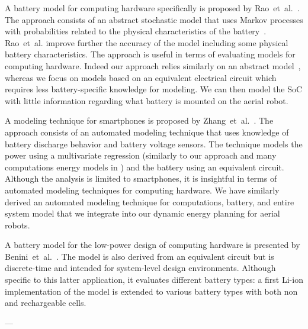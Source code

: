 A battery model for computing hardware specifically is proposed by Rao~et~al.~\citep{rao2005battery}. The approach consists of an abstract stochastic model that uses Markov processes with probabilities related to the physical characteristics of the battery~\citep{panigrahi2001battery}. Rao~et~al. improve further the accuracy of the model including some physical battery characteristics. The approach is useful in terms of evaluating models for computing hardware. Indeed our approach relies similarly on an abstract model~\citep{hasan2018exogenous}, whereas we focus on models based on an equivalent electrical circuit which requires less battery-specific knowledge for modeling. We can then model the SoC with little information regarding what battery is mounted on the aerial robot. 

A modeling technique for smartphones is proposed by Zhang~et~al.~\citep{zhang2010accurate}. The approach consists of an automated modeling technique that uses knowledge of battery discharge behavior and battery voltage sensors. The technique models the power using a multivariate regression (similarly to our approach and many computations energy models in ) and the battery using an equivalent circuit. Although the analysis is limited to smartphones, it is insightful in terms of automated modeling techniques for computing hardware. We have similarly derived an automated modeling technique for computations, battery, and entire system model that we integrate into our dynamic energy planning for aerial robots.

A battery model for the low-power design of computing hardware is presented by Benini~et~al.~\citep{benini2001discrete}. The model is also derived from an equivalent circuit but is discrete-time and intended for system-level design environments. Although specific to this latter application, it evaluates different battery types: a first Li-ion implementation of the model is extended to various battery types with both non and rechargeable cells. 




---






